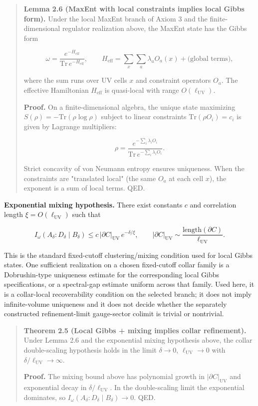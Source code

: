 \begin{quote}
\textbf{Lemma 2.6 (MaxEnt with local constraints implies local Gibbs form).} Under the local MaxEnt branch of Axiom 3 and the finite-dimensional regulator realization above, the MaxEnt state has the Gibbs form

\[
\omega = \frac{e^{-H_{\mathrm{eff}}}}{\mathrm{Tr}\,e^{-H_{\mathrm{eff}}}},
\qquad
H_{\mathrm{eff}} = \sum_x \sum_a \lambda_a O_a(x) + \text{(global terms)},
\]

where the sum runs over UV cells \(x\) and constraint operators \(O_a\). The effective Hamiltonian \(H_{\mathrm{eff}}\) is quasi-local with range \(O(\ell_{\mathrm{UV}})\).

\textbf{Proof.} On a finite-dimensional algebra, the unique state maximizing \(S(\rho) = -\mathrm{Tr}(\rho \log \rho)\) subject to linear constraints \(\mathrm{Tr}(\rho O_i) = c_i\) is given by Lagrange multipliers:

\[
\rho = \frac{e^{-\sum_i \lambda_i O_i}}{\mathrm{Tr}\,e^{-\sum_i \lambda_i O_i}}.
\]

Strict concavity of von Neumann entropy ensures uniqueness. When the constraints are "translated local" (the same \(O_a\) at each cell \(x\)), the exponent is a sum of local terms. QED.
\end{quote}

\textbf{Exponential mixing hypothesis.} There exist constants \(c\) and correlation length \(\xi = O(\ell_{\mathrm{UV}})\) such that

\[
I_\omega(A_\delta:D_\delta \mid B_\delta) \le
c\,\lvert\partial C\rvert_{\mathrm{UV}}\,e^{-\delta/\xi},
\qquad
\lvert\partial C\rvert_{\mathrm{UV}} \sim \frac{\mathrm{length}(\partial C)}{\ell_{\mathrm{UV}}}.
\]

This is the standard fixed-cutoff clustering/mixing condition used for local Gibbs states. One
sufficient realization on a chosen fixed-cutoff collar family is a Dobrushin-type uniqueness estimate
for the corresponding local Gibbs specifications, or a spectral-gap estimate uniform across that
family. Used here, it is
a collar-local recoverability condition on the selected branch; it does not imply infinite-volume
uniqueness and it does not decide whether the separately constructed refinement-limit gauge-sector
colimit is trivial or nontrivial.

\begin{quote}
\textbf{Theorem 2.5 (Local Gibbs + mixing implies collar refinement).} Under Lemma 2.6 and the exponential mixing hypothesis above, the collar double-scaling hypothesis holds in the limit \(\delta \to 0\), \(\ell_{\mathrm{UV}} \to 0\) with \(\delta/\ell_{\mathrm{UV}} \to \infty\).

\textbf{Proof.} The mixing bound above has polynomial growth in \(\lvert\partial C\rvert_{\mathrm{UV}}\) and exponential decay in \(\delta/\ell_{\mathrm{UV}}\). In the double-scaling limit the exponential dominates, so \(I_\omega(A_\delta:D_\delta \mid B_\delta) \to 0\). QED.
\end{quote}

